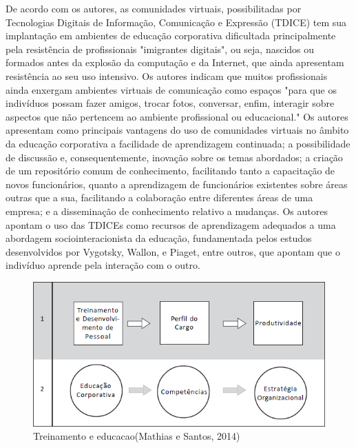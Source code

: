 De acordo com os autores, as comunidades virtuais, possibilitadas por Tecnologias Digitais de Informação, Comunicação e Expressão (TDICE) tem sua implantação em ambientes de educação corporativa dificultada principalmente pela resistência de profissionais "imigrantes digitais", ou seja, nascidos ou formados antes da explosão da computação e da Internet, que ainda apresentam resistência ao seu uso intensivo. Os autores indicam que muitos profissionais ainda enxergam ambientes  virtuais de comunicação como espaços "para que os indivíduos possam fazer amigos, trocar fotos, conversar, enfim, interagir sobre aspectos que não pertencem ao ambiente profissional ou educacional." Os autores apresentam como principais vantagens do uso de comunidades virtuais no âmbito da educação corporativa a facilidade de aprendizagem continuada; a possibilidade de discussão  e, consequentemente, inovação sobre os temas abordados; a criação de um repositório comum de conhecimento, facilitando tanto a capacitação de novos funcionários, quanto a aprendizagem de funcionários existentes sobre áreas outras que a sua, facilitando a colaboração entre diferentes áreas de uma empresa; e a disseminação de conhecimento relativo a mudanças. Os autores apontam o uso das TDICEs como recursos de aprendizagem adequados a uma abordagem sociointeracionista da educação, fundamentada pelos estudos desenvolvidos por Vygotsky, Wallon, e Piaget, entre outros, que apontam que o indivíduo aprende pela interação com o outro. 








\begin{figure}
            \begin{center}
                \includegraphics[width=1\textwidth]{Treinamento_v_educacao.png}
            \end{center}
            \caption{Treinamento e educacao(Mathias e Santos, 2014\cite{Mathias_Santos_2014})}
            \label{fig:Treinamento_v_Educacao}
\end{figure}

